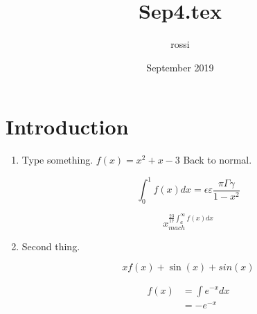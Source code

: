 \documentclass{article}
\title{Sep4.tex}
\author{rossi }
\date{September 2019}
\begin{document}
\maketitle

\section{Introduction}

\LARGE

\begin{enumerate}
\item Type something.  $f(x) = x^2 + x - 3$  Back to normal.

\[
\int_0^1 f(x) dx = \epsilon \varepsilon \frac{\pi \Gamma \gamma}{1-x^2}
\]

\[
x^{\frac{23}{17} \int_a^\infty f(x) dx}_{mach}
\]

\item Second thing.

\[
x f(x) + \sin(x) + sin(x)
\]

\begin{align*}
    f(x) & = \int e^{-x} dx \\
    & = - e^{-x}
\end{align*}

\end{enumerate}
\end{document}
